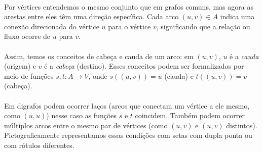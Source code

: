\documentclass[12pt,a4paper]{article}
\begin{document}
\paragraph{}
Por vértices entendemos o mesmo conjunto que em grafos comuns, mas agora as arestas entre eles têm uma direção específica. Cada arco \((u, v) \in A\) indica uma conexão direcionada do vértice \(u\) para o vértice \(v\), significando que a relação ou fluxo ocorre de \(u\) para \(v\).

\paragraph{}
Assim, temos os conceitos de cabeça e cauda de um arco: em \((u, v)\), \(u\) é a \emph{cauda} (origem) e \(v\) é a \emph{cabeça} (destino). Esses conceitos podem ser formalizados por meio de funções \(s, t: A \to V\), onde \(s((u, v)) = u\) (cauda) e \(t((u, v)) = v\) (cabeça).

\begin{center}
\label{fig:def-digrafo}
\end{center}

\paragraph{}
Em digrafos podem ocorrer laços (arcos que conectam um vértice a ele mesmo, como \((u, u)\)) nesse caso as funções \(s\) e \(t\) coincidem. Também podem ocorrer múltiplos arcos entre o mesmo par de vértices (como \((u, v)\) e \((u, v)\) distintos). Pictograficamente representamos essas condições com setas com dupla ponta ou com rótulos diferentes.
\end{document}
